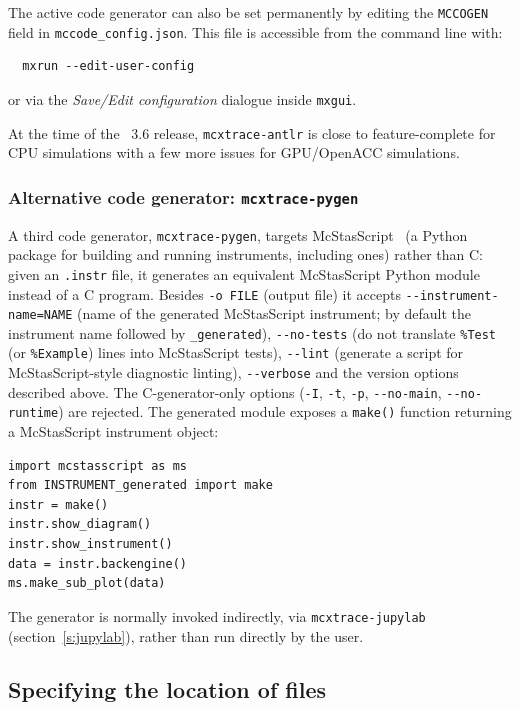 The active code generator can also be set permanently by editing the
\texttt{MCCOGEN} field in \texttt{mccode\_config.json}.  This file is
accessible from the command line with:
\begin{verbatim}
  mxrun --edit-user-config
\end{verbatim}
or via the \emph{Save/Edit configuration} dialogue inside \texttt{mxgui}.

At the time of the \MCX~3.6 release, \texttt{mcxtrace-antlr} is close to
feature-complete for CPU simulations with a few more issues for GPU/OpenACC
simulations.

\subsubsection*{Alternative code generator: \texttt{mcxtrace-pygen}}

A third code generator, \texttt{mcxtrace-pygen}, targets
McStasScript~\cite{mcstasscript} (a Python package for building and running
instruments, including \MCX ones) rather than C: given an \texttt{.instr}
file, it generates an equivalent McStasScript Python module instead of a C
program. Besides \verb+-o FILE+ (output file) it accepts
\verb+--instrument-name=NAME+ (name of the generated McStasScript instrument;
by default the instrument name followed by \texttt{\_generated}),
\verb+--no-tests+ (do not translate \texttt{\%Test} (or \texttt{\%Example}) lines into McStasScript
tests), \verb+--lint+ (generate a script for McStasScript-style diagnostic
linting), \verb+--verbose+ and the version options described above. The
C-generator-only options (\verb+-I+, \verb+-t+, \verb+-p+, \verb+--no-main+,
\verb+--no-runtime+) are rejected. The generated module exposes a
\texttt{make()} function returning a McStasScript instrument object:
\begin{lstlisting}
import mcstasscript as ms
from INSTRUMENT_generated import make
instr = make()
instr.show_diagram()
instr.show_instrument()
data = instr.backengine()
ms.make_sub_plot(data)
\end{lstlisting}
The generator is normally invoked indirectly, via \texttt{mcxtrace-jupylab}
(section~\ref{s:jupylab}), rather than run directly by the user.


\subsection{Specifying the location of files}
\label{s:files}

